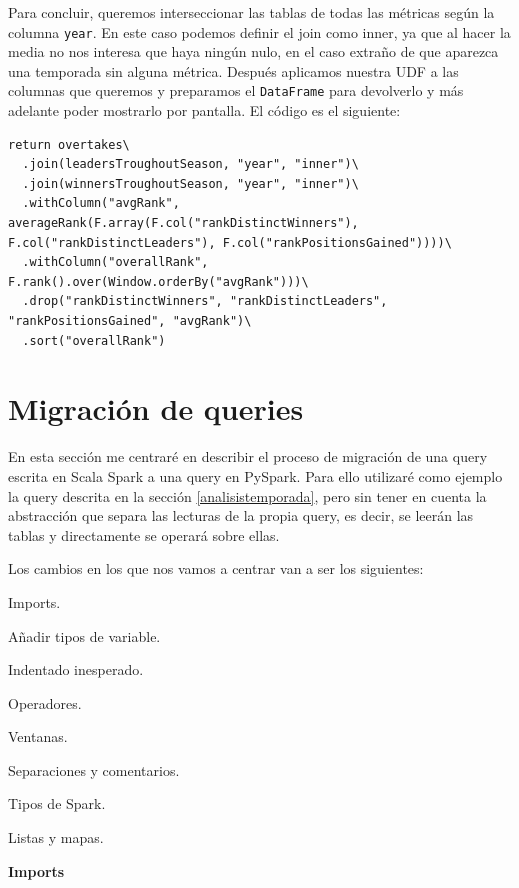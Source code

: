 \documentclass[12pt,twoside,titlepage]{report}
\begin{document}
Para concluir, queremos interseccionar las tablas de todas las métricas según la columna \texttt{year}. En este caso podemos definir el join como inner, ya que al hacer la media no nos interesa que haya ningún nulo, en el caso extraño de que aparezca una temporada sin alguna métrica. Después aplicamos nuestra UDF a las columnas que queremos y preparamos el \texttt{DataFrame} para devolverlo y más adelante poder mostrarlo por pantalla. El código es el siguiente:

\begin{lstlisting}
return overtakes\
  .join(leadersTroughoutSeason, "year", "inner")\
  .join(winnersTroughoutSeason, "year", "inner")\
  .withColumn("avgRank", averageRank(F.array(F.col("rankDistinctWinners"), F.col("rankDistinctLeaders"), F.col("rankPositionsGained"))))\
  .withColumn("overallRank", F.rank().over(Window.orderBy("avgRank")))\
  .drop("rankDistinctWinners", "rankDistinctLeaders", "rankPositionsGained", "avgRank")\
  .sort("overallRank")
\end{lstlisting}



\section{Migración de queries}
\label{sec:migracion}

En esta sección me centraré en describir el proceso de migración de una query escrita en Scala Spark a una query en PySpark. Para ello utilizaré como ejemplo la query descrita en la sección \ref{analisistemporada}, pero sin tener en cuenta la abstracción que separa las lecturas de la propia query, es decir, se leerán las tablas y directamente se operará sobre ellas.

Los cambios en los que nos vamos a centrar van a ser los siguientes:

\begin{compactitem}
	\item Imports.
	\item Añadir tipos de variable.
	\item Indentado inesperado.
	\item Operadores.
	\item Ventanas.
	\item Separaciones y comentarios.
	\item Tipos de Spark.
	\item Listas y mapas.
\end{compactitem}


\textbf{Imports}
\end{document}
